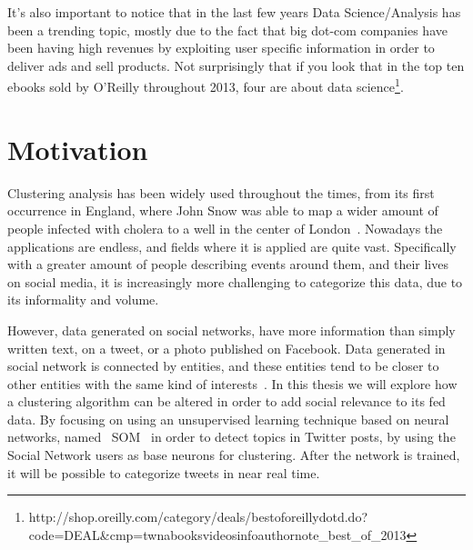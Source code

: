 It's also important to notice that in the last few years Data Science/Analysis has been a trending topic, mostly due to the fact that big dot-com companies have been having high revenues by exploiting user specific information in order to deliver ads and sell products. Not surprisingly that if you look that in the top ten ebooks sold by O'Reilly throughout 2013, four are about data science\footnote{http://shop.oreilly.com/category/deals/best\-of\-oreilly\-dotd.do?code=DEAL\&cmp=tw\-na\-books\-videos\-info\-authornote\_best\_of\_2013}.
 

\section{Motivation}
Clustering analysis has been widely used throughout the times, from its first occurrence in England, where John Snow was able to map a wider amount of people infected with cholera to a well in the center of London~\cite{snow1855mode}. Nowadays the applications are endless, and fields where it is applied are quite vast. Specifically with a greater amount of people describing events around them, and their lives on social media, it is increasingly more challenging to categorize this data, due to its informality and volume. 

However, data generated on social networks, have more information than simply written text, on a tweet, or a photo published on Facebook. Data generated in social network is connected by entities, and these entities tend to be closer to other entities with the same kind of interests~\cite{McPherson2001}. In this thesis we will explore how a clustering algorithm can be altered in order to add social relevance to its fed data. By focusing  on using an unsupervised learning technique based on neural networks, named ~\ac{SOM}~\cite{Kohonen1990} in order to detect topics in Twitter posts, by using the Social Network users as base neurons for clustering. After the network is trained, it will be possible to categorize tweets in near real time. 

